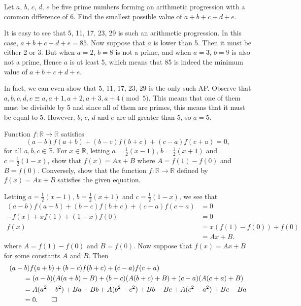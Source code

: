 \begin{question}
    Let $a$, $b$, $c$, $d$, $e$ be five prime numbers forming an arithmetic
    progression with a common difference of 6. Find the smallest possible value
    of $a + b + c + d + e$. 
\end{question}
\begin{solution}
    It is easy to see that 5, 11, 17, 23, 29 is such an arithmetic progression.
    In this case, $a + b + c + d + e = 85$. Now suppose that $a$ is lower than
    5. Then it must be either 2 or 3. But when $a = 2$, $b = 8$ is not a prime,
    and when $a = 3$, $b = 9$ is also not a prime, Hence $a$ is at least 5,
    which means that 85 is indeed the minimum value of $a + b + c + d + e$.
\end{solution}
\begin{remark}
    In fact, we can even show that 5, 11, 17, 23, 29 is the only such AP.
    Observe that $a, b, c, d, e \equiv a, a + 1, a + 2, a + 3, a + 4 \pmod{5}$.
    This means that one of them must be divisible by 5 and since all of them
    are primes, this means that it must be equal to 5. However, $b$, $c$, $d$
    and $e$ are all greater than 5, so $a = 5$. 
\end{remark}

\begin{question}
    Function $f:\mathbb{R} \rightarrow \mathbb{R}$ satisfies 
    \[(a - b)f(a + b) + (b - c)f(b + c) + (c - a)f(c + a) = 0,\] 
    for all $a, b, c \in \mathbb{R}$. For $x \in \mathbb{R}$, letting $a =
    \frac{1}{2}(x - 1)$, $b = \frac{1}{2}(x + 1)$ and $c = \frac{1}{2}(1 - x)$,
    show that $f(x) = Ax + B$ where $A = f(1) - f(0)$ and $B = f(0)$.
    Conversely, show that the function $f:\mathbb{R} \rightarrow \mathbb{R}$
    defined by $f(x) = Ax + B$ satisfies the given equation. 
\end{question}
\begin{solution}
    Letting $a = \frac{1}{2}(x - 1)$, $b = \frac{1}{2}(x + 1)$ and $c =
    \frac{1}{2}(1 - x)$, we see that
    \begin{align*}
        (a - b)f(a + b) + (b - c)f(b + c) + (c - a)f(c + a) &= 0\\
        -f(x) + xf(1) + (1 - x)f(0) &= 0\\
        f(x) &= x(f(1) - f(0)) + f(0)\\
        &= Ax + B.
    \end{align*}
    where $A = f(1) - f(0)$ and $B = f(0)$. Now suppose that $f(x) =  Ax + B$
    for some constants $A$ and $B$. Then
    \begin{align*}
        \MoveEqLeft
    (a - b)f(a + b) + (b - c)f(b + c) + (c - a)f(c + a)\\
        &= (a - b)(A(a + b) + B) + (b - c)(A(b + c) + B) + (c - a)(A(c + a) + B)\\
        &= A(a^2 - b^2) + Ba - Bb + A(b^2 - c^2) + Bb - Bc + A(c^2 - a^2) + Bc - Ba\\
        &= 0. \qedhere
    \end{align*}
\end{solution}

